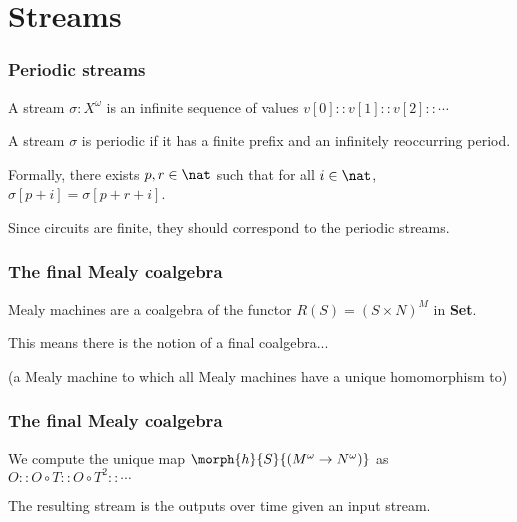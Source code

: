 \section{Streams}

\begin{frame}
    \frametitle{Periodic streams}

    A stream $\sigma : X^\omega$ is an \alert{infinite sequence} of values $v[0] :: v[1] :: v[2] :: \cdots$

    \pause

    A stream $\sigma$ is \alert{periodic} if it has a finite \alert{prefix} and an infinitely reoccurring \alert{period}.
    
    \pause

    Formally, there exists $p,r \in \nat$ such that for all $i \in \nat$, $\sigma[p+i] = \sigma[p+r+i]$.
    
    \pause

    Since circuits are \alert{finite}, they should correspond to the \alert{periodic streams}.

\end{frame}

\begin{frame}
    \frametitle{The final Mealy coalgebra}

    Mealy machines are a \alert{coalgebra} of the functor $R(S) = (S \times N)^M$ in \textbf{Set}.

    \pause

    This means there is the notion of a \alert{final coalgebra}...

    (a Mealy machine to which all Mealy machines have a unique homomorphism to)

\end{frame}

\begin{frame}
    \frametitle{The final Mealy coalgebra}

    \pause

    \begin{center}
        
    \end{center}

    We compute the \alert{unique map} $\morph{h}{S}{(M^\omega \to N^\omega)}$ as $O :: O \circ T :: O \circ T^2 :: \cdots$

    \pause

    The resulting stream is the \alert{outputs over time} given an \alert{input stream}.


\end{frame}


